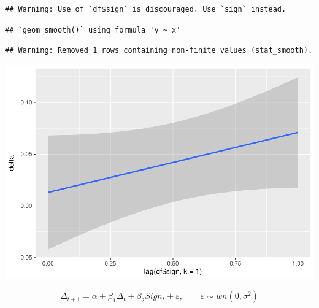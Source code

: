 \documentclass[11pt, a4paper]{report}
\newenvironment{Shaded}{\begin{snugshade}}{\end{snugshade}}
\newcommand{\DataTypeTok}[1]{\textcolor[rgb]{0.13,0.29,0.53}{#1}}
\newcommand{\DecValTok}[1]{\textcolor[rgb]{0.00,0.00,0.81}{#1}}
\newcommand{\KeywordTok}[1]{\textcolor[rgb]{0.13,0.29,0.53}{\textbf{#1}}}
\newcommand{\NormalTok}[1]{#1}
\newcommand{\OperatorTok}[1]{\textcolor[rgb]{0.81,0.36,0.00}{\textbf{#1}}}
\newcommand{\StringTok}[1]{\textcolor[rgb]{0.31,0.60,0.02}{#1}}
\theoremstyle{plain}
\theoremstyle{plain}
\theoremstyle{remark}
\begin{document}
\begin{Shaded}
\end{Shaded}

\begin{verbatim}
## Warning: Use of `df$sign` is discouraged. Use `sign` instead.
\end{verbatim}

\begin{verbatim}
## `geom_smooth()` using formula 'y ~ x'
\end{verbatim}

\begin{verbatim}
## Warning: Removed 1 rows containing non-finite values (stat_smooth).
\end{verbatim}

\begin{center}\includegraphics{Econo2_P1_files/figure-latex/lm signt-1} \end{center}

\[\Delta_{t+1} = \alpha + \beta_1 \Delta_t + \beta_2Sign_t + \varepsilon, \hspace{2em} \varepsilon \sim wn(0, \sigma^2)\]

\begin{Shaded}
\end{Shaded}
\end{document}
